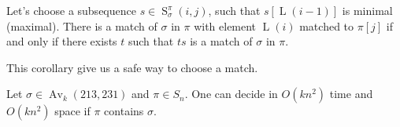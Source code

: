 \documentclass[a4paper]{llncs}
\DeclareMathOperator{\AV}{Av}
\newcommand{\ptext}{\pi}
\newcommand{\pmotif}{\sigma}
\DeclareMathOperator{\firsta}{L}
\newcommand{\first}[1]{\firsta({#1})}
\DeclareMathOperator{\factora}{F}
\newcommand{\factor}[1]{\factora({#1})}
\DeclareMathOperator{\SETa}{S}
\newcommand{\SET}[4]{\SETa_{{#1}}^{{#2}}({#3},{#4})}
\begin{document}
\begin{corollary}
Let's choose a subsequence $s \in \SET{\pmotif}{\ptext}{i}{j}$, such that $s[\first{i-1}]$ is minimal (maximal). There is a match of $\pmotif$ in $\ptext$ with element $\first{i}$ matched to $\ptext[j]$ if and only if there exists $t$ such that $ts$ is a match of $\pmotif$ in $\ptext$. 
\end{corollary}

This corollary give us a safe way to choose a match.

\begin{proposition}
	\label{Proposition:sigma avoids 213 and 231}
	Let $\sigma \in \AV_k(213,231)$ and $\pi \in S_n$.
	One can decide in $O(kn^2)$ time
	and $O(kn^2)$ space if $\pi$ contains $\sigma$.
\end{proposition}

\end{document}
